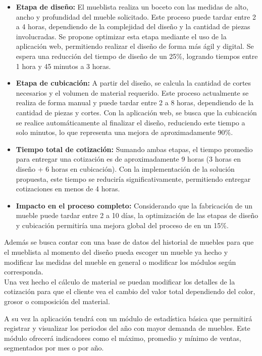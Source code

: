 \documentclass[12pt,oneside]{article}
\begin{document}
\begin{itemize}
    \item \textbf{Etapa de diseño:} El mueblista realiza un boceto con las medidas de alto, ancho y profundidad del mueble solicitado. Este proceso puede tardar entre 2 a 4 horas, dependiendo de la complejidad del diseño y la cantidad de piezas involucradas. Se propone optimizar esta etapa mediante el uso de la aplicación web, permitiendo realizar el diseño de forma más ágil y digital. Se espera una reducción del tiempo de diseño de un 25\%, logrando tiempos entre 1 hora y 45 minutos a 3 horas.

    \item \textbf{Etapa de cubicación:} A partir del diseño, se calcula la cantidad de cortes necesarios y el volumen de material requerido. Este proceso actualmente se realiza de forma manual y puede tardar entre 2 a 8 horas, dependiendo de la cantidad de piezas y cortes. Con la aplicación web, se busca que la cubicación se realice automáticamente al finalizar el diseño, reduciendo este tiempo a solo minutos, lo que representa una mejora de aproximadamente 90\%.

    \item \textbf{Tiempo total de cotización:} Sumando ambas etapas, el tiempo promedio para entregar una cotización es de aproximadamente 9 horas (3 horas en diseño + 6 horas en cubicación). Con la implementación de la solución propuesta, este tiempo se reduciría significativamente, permitiendo entregar cotizaciones en menos de 4 horas.

    \item \textbf{Impacto en el proceso completo:} Considerando que la fabricación de un mueble puede tardar entre 2 a 10 días, la optimización de las etapas de diseño y cubicación permitiría una mejora global del proceso de en un 15\%.
\end{itemize}

Además se busca contar con una base de datos del historial de muebles para que el mueblista al momento del diseño pueda escoger un mueble ya hecho y modificar las medidas del mueble en general o modificar los módulos según corresponda.\\

Una vez hecho el cálculo de material se puedan modificar los detalles de la cotización para que el cliente vea el cambio del valor total dependiendo del color, grosor o composición del material.

A su vez la aplicación tendrá con un módulo de estadística básica que permitirá registrar y visualizar los periodos del año con mayor demanda de muebles. Este módulo ofrecerá indicadores como el máximo, promedio y mínimo de ventas, segmentados por mes o por año.
\end{document}
